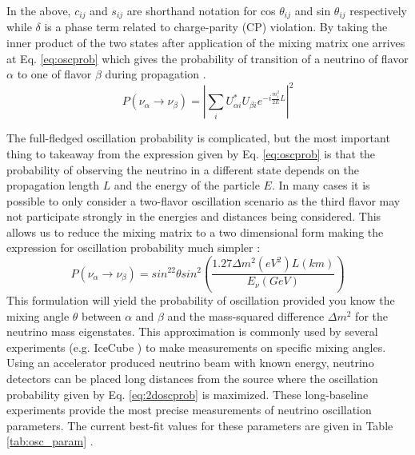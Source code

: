 \documentclass{gatech-thesis}
\begin{document}
In the above, $c_{ij}$ and $s_{ij}$ are shorthand notation for cos $ \theta_{ij}$ and sin $\theta_{ij}$ respectively while $\delta$ is a phase term related to charge-parity (CP) violation. By taking the inner product of the two states after application of the mixing matrix one arrives at Eq. \ref{eq:oscprob} which gives the probability of transition of a neutrino of flavor $\alpha$ to one of flavor $\beta$ during propagation \cite{2008PrPNP..60..338N}.
\begin{equation}\label{eq:oscprob}
P(\nu_{\alpha}\rightarrow \nu_{\beta}) = \left| \sum_{i} U_{\alpha i}^* U_{\beta i} e^{-i\frac{m_{i}^2}{2E}L}\right| ^2
\end{equation}

The full-fledged oscillation probability is complicated, but the most important thing to takeaway from the expression given by Eq. \ref{eq:oscprob} is that the probability of observing the neutrino in a different state depends on the propagation length $L$ and the energy of the particle $E$. In many cases it is possible to only consider a two-flavor oscillation scenario as the third flavor may not participate strongly in the energies and distances being considered. This allows us to reduce the mixing matrix to a two dimensional form making the expression for oscillation probability much simpler \cite{1998PhRvL..81.1562F}:
\begin{equation}\label{eq:2doscprob}
P(\nu_{\alpha}\rightarrow \nu_{\beta}) = sin^22\theta sin^2\left(\frac{1.27\Delta m^2 (eV^2) L (km)}{E_\nu (GeV)}\right)
\end{equation}
This formulation will yield the probability of oscillation provided you know the mixing angle $\theta$ between $\alpha$ and $\beta$ and the mass-squared difference $\Delta m^2$ for the neutrino mass eigenstates. This approximation is commonly used by several experiments (e.g. IceCube \cite{2013PhRvL.111h1801A}) to make measurements on specific mixing angles. Using an accelerator produced neutrino beam with known energy, neutrino detectors can be placed long distances from the source where the oscillation probability given by Eq. \ref{eq:2doscprob} is maximized. These long-baseline experiments provide the most precise measurements of neutrino oscillation parameters. The current best-fit values for these parameters are given in Table \ref{tab:osc_param} \cite{PhysRevD.89.093018}.
\end{document}
